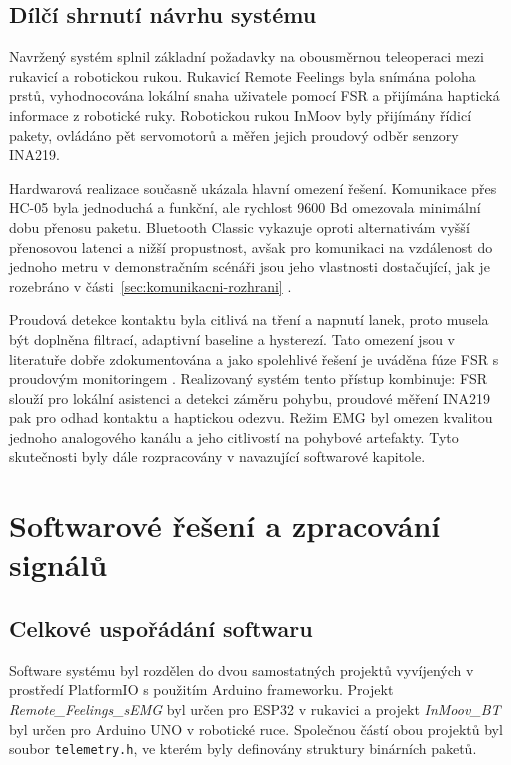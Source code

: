 \documentclass[FZS,DP]{tulthesis}
\begin{document}
\section{Dílčí shrnutí návrhu systému}
\label{sec:shrnuti-navrhu}

Navržený systém splnil základní požadavky na obousměrnou teleoperaci mezi rukavicí a robotickou rukou. Rukavicí Remote Feelings byla snímána poloha prstů, vyhodnocována lokální snaha uživatele pomocí FSR a přijímána haptická informace z robotické ruky. Robotickou rukou InMoov byly přijímány řídicí pakety, ovládáno pět servomotorů a měřen jejich proudový odběr senzory INA219.

Hardwarová realizace současně ukázala hlavní omezení řešení. Komunikace přes HC-05 byla jednoduchá a funkční, ale rychlost 9600 Bd omezovala minimální dobu přenosu paketu. Bluetooth Classic vykazuje oproti alternativám vyšší přenosovou latenci a nižší propustnost, avšak pro komunikaci na vzdálenost do jednoho metru v demonstračním scénáři jsou jeho vlastnosti dostačující, jak je rozebráno v části~\ref{sec:komunikacni-rozhrani} \cite{Eridani2021918,Kos2018}.

Proudová detekce kontaktu byla citlivá na tření a napnutí lanek, proto musela být doplněna filtrací, adaptivní baseline a hysterezí. Tato omezení jsou v literatuře dobře zdokumentována a jako spolehlivé řešení je uváděna fúze FSR s proudovým monitoringem \cite{Mohammadi2024418,Lebosse2011}. Realizovaný systém tento přístup kombinuje: FSR slouží pro lokální asistenci a detekci záměru pohybu, proudové měření INA219 pak pro odhad kontaktu a haptickou odezvu. Režim EMG byl omezen kvalitou jednoho analogového kanálu a jeho citlivostí na pohybové artefakty. Tyto skutečnosti byly dále rozpracovány v navazující softwarové kapitole.

\chapter{Softwarové řešení a zpracování signálů}
\label{chap:software}

\section{Celkové uspořádání softwaru}
\label{sec:celkove-usporadani-softwaru}

Software systému byl rozdělen do dvou samostatných projektů vyvíjených v prostředí PlatformIO s použitím Arduino frameworku. Projekt \textit{Remote\_Feelings\_sEMG} byl určen pro ESP32 v rukavici a projekt \textit{InMoov\_BT} byl určen pro Arduino UNO v robotické ruce. Společnou částí obou projektů byl soubor \texttt{telemetry.h}, ve kterém byly definovány struktury binárních paketů.
\end{document}
